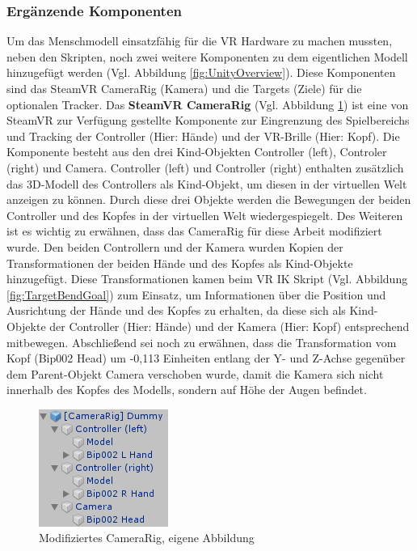\subsubsection{Ergänzende Komponenten}\label{sec:MMKomponenten}
Um das Menschmodell einsatzfähig für die VR Hardware zu machen mussten, neben den Skripten, noch zwei weitere Komponenten zu dem eigentlichen Modell hinzugefügt werden (Vgl. Abbildung \ref{fig:UnityOverview}). Diese Komponenten sind das SteamVR CameraRig (Kamera) und die Targets (Ziele) für die optionalen Tracker.
\newline\newline
Das \textbf{SteamVR CameraRig} (Vgl. Abbildung \ref{fig:CameraRig}) ist eine von SteamVR zur Verfügung gestellte Komponente zur Eingrenzung des Spielbereichs und Tracking der Controller (Hier: Hände) und der VR-Brille (Hier: Kopf). Die Komponente besteht aus den drei Kind-Objekten Controller (left), Controler (right) und Camera. Controller (left) und Controller (right) enthalten zusätzlich das 3D-Modell des Controllers als Kind-Objekt, um diesen in der virtuellen Welt anzeigen zu können. Durch diese drei Objekte werden die Bewegungen der beiden Controller und des Kopfes in der virtuellen Welt wiedergespiegelt. Des Weiteren ist es wichtig zu erwähnen, dass das CameraRig für diese Arbeit modifiziert wurde. Den beiden Controllern und der Kamera wurden Kopien der Transformationen der beiden Hände und des Kopfes als Kind-Objekte hinzugefügt. Diese Transformationen kamen beim VR IK Skript (Vgl. Abbildung \ref{fig:TargetBendGoal}) zum Einsatz, um Informationen über die Position und Ausrichtung der Hände und des Kopfes zu erhalten, da diese sich als Kind-Objekte der Controller (Hier: Hände) und der Kamera (Hier: Kopf) entsprechend mitbewegen. Abschließend sei noch zu erwähnen, dass die Transformation vom Kopf (Bip002 Head) um -0,113 Einheiten entlang der Y- und Z-Achse gegenüber dem Parent-Objekt Camera verschoben wurde, damit die Kamera sich nicht innerhalb des Kopfes des Modells, sondern auf Höhe der Augen befindet.
\begin{figure}[h]
	\centering
	\includegraphics[width=0.25\linewidth]{Bilder/A37_CameraRig}
	\caption{Modifiziertes CameraRig, eigene Abbildung}
	\label{fig:CameraRig}
\end{figure}
